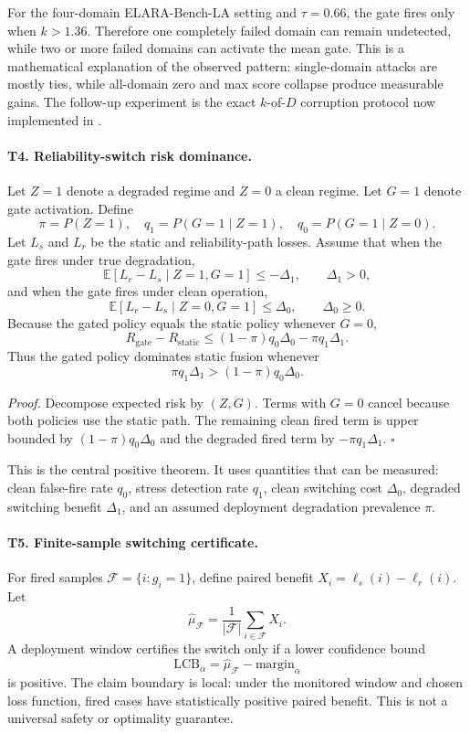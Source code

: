 \documentclass[11pt]{article}
\newcommand{\benchmark}{ELARA-Bench-LA}
\begin{document}
For the four-domain \benchmark{} setting and $\tau=0.66$, the gate fires only
when $k>1.36$. Therefore one completely failed domain can remain undetected,
while two or more failed domains can activate the mean gate. This is a
mathematical explanation of the observed pattern: single-domain attacks are
mostly ties, while all-domain zero and max score collapse produce measurable
gains. The follow-up experiment is the exact $k$-of-$D$ corruption protocol now
implemented in .

\paragraph{T4. Reliability-switch risk dominance.}
Let $Z=1$ denote a degraded regime and $Z=0$ a clean regime. Let
$G=1$ denote gate activation. Define
\[
  \pi=P(Z=1),\quad q_1=P(G=1\mid Z=1),\quad q_0=P(G=1\mid Z=0).
\]
Let $L_s$ and $L_r$ be the static and reliability-path losses. Assume that when
the gate fires under true degradation,
\[
  \mathbb{E}[L_r-L_s\mid Z=1,G=1]\leq-\Delta_1,\qquad \Delta_1>0,
\]
and when the gate fires under clean operation,
\[
  \mathbb{E}[L_r-L_s\mid Z=0,G=1]\leq\Delta_0,\qquad \Delta_0\geq0.
\]
Because the gated policy equals the static policy whenever $G=0$,
\[
  R_{\mathrm{gate}}-R_{\mathrm{static}}
  \leq (1-\pi)q_0\Delta_0-\pi q_1\Delta_1.
\]
Thus the gated policy dominates static fusion whenever
\[
  \pi q_1\Delta_1 > (1-\pi)q_0\Delta_0.
\]

\emph{Proof.} Decompose expected risk by $(Z,G)$. Terms with $G=0$ cancel
because both policies use the static path. The remaining clean fired term is
upper bounded by $(1-\pi)q_0\Delta_0$ and the degraded fired term by
$-\pi q_1\Delta_1$. \hfill$\square$

This is the central positive theorem. It uses quantities that can be measured:
clean false-fire rate $q_0$, stress detection rate $q_1$, clean switching cost
$\Delta_0$, degraded switching benefit $\Delta_1$, and an assumed deployment
degradation prevalence $\pi$.

\paragraph{T5. Finite-sample switching certificate.}
For fired samples $\mathcal{F}=\{i:g_i=1\}$, define paired benefit
$X_i=\ell_s(i)-\ell_r(i)$. Let
\[
  \hat\mu_{\mathcal{F}}=\frac{1}{|\mathcal{F}|}\sum_{i\in\mathcal{F}}X_i.
\]
A deployment window certifies the switch only if a lower confidence bound
\[
  \mathrm{LCB}_{\alpha}
  =\hat\mu_{\mathcal{F}}-\mathrm{margin}_{\alpha}
\]
is positive. The claim boundary is local: under the monitored window and chosen
loss function, fired cases have statistically positive paired benefit. This is
not a universal safety or optimality guarantee.
\end{document}
